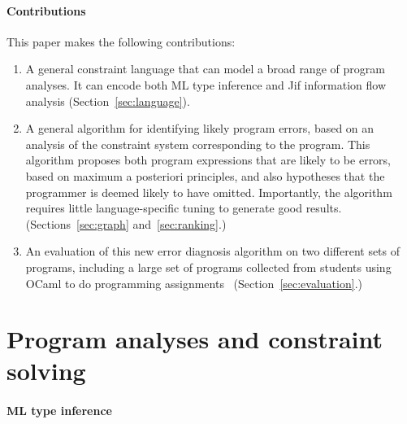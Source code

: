\paragraph{Contributions}

This paper makes the following contributions:

\begin{enumerate}
\item
A general constraint language that can model a broad
range of program analyses. It can encode both ML type
inference and Jif information flow analysis
(Section~\ref{sec:language}).

\item
A general algorithm for identifying likely program errors,
based on an analysis of the constraint system corresponding
to the program. This algorithm proposes both program expressions
that are likely to be errors, based on maximum a posteriori
principles, and also hypotheses that the programmer is
deemed likely to have omitted. Importantly, the algorithm
requires little language-specific tuning to generate good results.
(Sections~\ref{sec:graph} and~\ref{sec:ranking}.)

\item
An evaluation of this new error diagnosis algorithm on two
different sets of programs, including a large set of programs
collected from students using OCaml to do
programming assignments~\cite{lerner:pldi07}
(Section~\ref{sec:evaluation}.)

\end{enumerate}

\section{Program analyses and constraint solving}



\paragraph{ML type inference}

